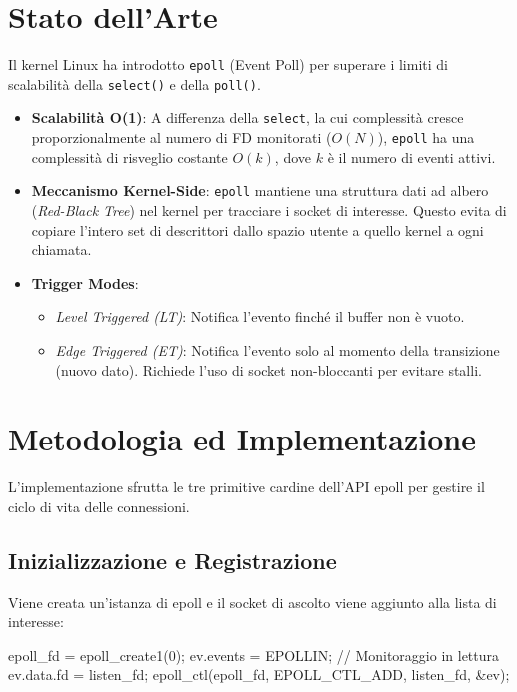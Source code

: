 \documentclass[a4paper,12pt]{article}
\begin{document}
\section{Stato dell'Arte}
Il kernel Linux ha introdotto \texttt{epoll} (Event Poll) per superare i limiti di scalabilità della \texttt{select()} e della \texttt{poll()}.
\begin{itemize}
    \item \textbf{Scalabilità O(1)}: A differenza della \texttt{select}, la cui complessità cresce proporzionalmente al numero di FD monitorati ($O(N)$), \texttt{epoll} ha una complessità di risveglio costante $O(k)$, dove $k$ è il numero di eventi attivi.
    \item \textbf{Meccanismo Kernel-Side}: \texttt{epoll} mantiene una struttura dati ad albero (\textit{Red-Black Tree}) nel kernel per tracciare i socket di interesse. Questo evita di copiare l'intero set di descrittori dallo spazio utente a quello kernel a ogni chiamata.
    \item \textbf{Trigger Modes}: 
    \begin{itemize}
        \item \textit{Level Triggered (LT)}: Notifica l'evento finché il buffer non è vuoto.
        \item \textit{Edge Triggered (ET)}: Notifica l'evento solo al momento della transizione (nuovo dato). Richiede l'uso di socket non-bloccanti per evitare stalli.
    \end{itemize}
\end{itemize}

\section{Metodologia ed Implementazione}
L'implementazione sfrutta le tre primitive cardine dell'API epoll per gestire il ciclo di vita delle connessioni.

\subsection{Inizializzazione e Registrazione}
Viene creata un'istanza di epoll e il socket di ascolto viene aggiunto alla lista di interesse:
\begin{ccode}
epoll_fd = epoll_create1(0);
ev.events = EPOLLIN; // Monitoraggio in lettura
ev.data.fd = listen_fd;
epoll_ctl(epoll_fd, EPOLL_CTL_ADD, listen_fd, &ev);
\end{ccode}
\end{document}
